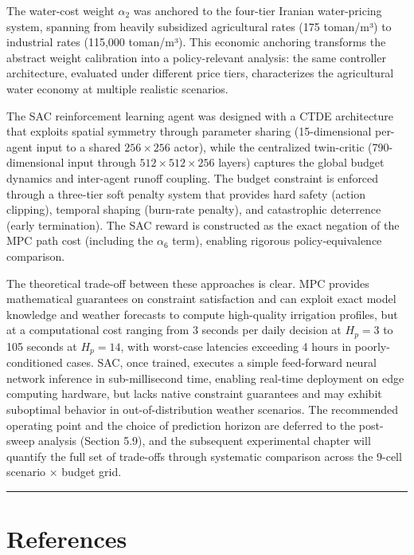 The water-cost weight \(\alpha_2\) was anchored to the four-tier Iranian
water-pricing system, spanning from heavily subsidized agricultural
rates (175 toman/m³) to industrial rates (115,000 toman/m³). This
economic anchoring transforms the abstract weight calibration into a
policy-relevant analysis: the same controller architecture, evaluated
under different price tiers, characterizes the agricultural water
economy at multiple realistic scenarios.

The SAC reinforcement learning agent was designed with a CTDE
architecture that exploits spatial symmetry through parameter sharing
(15-dimensional per-agent input to a shared \(256 \times 256\) actor),
while the centralized twin-critic (790-dimensional input through
\(512 \times 512 \times 256\) layers) captures the global budget
dynamics and inter-agent runoff coupling. The budget constraint is
enforced through a three-tier soft penalty system that provides hard
safety (action clipping), temporal shaping (burn-rate penalty), and
catastrophic deterrence (early termination). The SAC reward is
constructed as the exact negation of the MPC path cost (including the
\(\alpha_6\) term), enabling rigorous policy-equivalence comparison.

The theoretical trade-off between these approaches is clear. MPC
provides mathematical guarantees on constraint satisfaction and can
exploit exact model knowledge and weather forecasts to compute
high-quality irrigation profiles, but at a computational cost ranging
from 3 seconds per daily decision at \(H_p = 3\) to 105 seconds at
\(H_p = 14\), with worst-case latencies exceeding 4 hours in
poorly-conditioned cases. SAC, once trained, executes a simple
feed-forward neural network inference in sub-millisecond time, enabling
real-time deployment on edge computing hardware, but lacks native
constraint guarantees and may exhibit suboptimal behavior in
out-of-distribution weather scenarios. The recommended operating point
and the choice of prediction horizon are deferred to the post-sweep
analysis (Section 5.9), and the subsequent experimental chapter will
quantify the full set of trade-offs through systematic comparison across
the 9-cell scenario × budget grid.

\begin{center}\rule{0.5\linewidth}{0.5pt}\end{center}

\section{References}\label{references}

